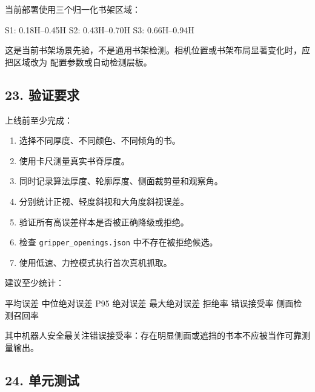 \documentclass[
  chinese,
  11pt,
  a4paper,
]{article}
\newenvironment{Shaded}{\begin{snugshade}}{\end{snugshade}}
\newcommand{\NormalTok}[1]{#1}
\providecommand{\tightlist}{%
  \setlength{\itemsep}{0pt}\setlength{\parskip}{0pt}}
\begin{document}
当前部署使用三个归一化书架区域：

\begin{Shaded}
\begin{Highlighting}[]
\NormalTok{S1: 0.18H–0.45H}
\NormalTok{S2: 0.43H–0.70H}
\NormalTok{S3: 0.66H–0.94H}
\end{Highlighting}
\end{Shaded}

这是当前书架场景先验，不是通用书架检测。相机位置或书架布局显著变化时，应把区域改为
配置参数或自动检测层板。

\subsection{23. 验证要求}\label{23-ux9a8cux8bc1ux8981ux6c42}

上线前至少完成：

\begin{enumerate}
\def\labelenumi{\arabic{enumi}.}
\tightlist
\item
  选择不同厚度、不同颜色、不同倾角的书。
\item
  使用卡尺测量真实书脊厚度。
\item
  同时记录算法厚度、轮廓厚度、侧面裁剪量和观察角。
\item
  分别统计正视、轻度斜视和大角度斜视误差。
\item
  验证所有高误差样本是否被正确降级或拒绝。
\item
  检查 \texttt{gripper\_openings.json} 中不存在被拒绝候选。
\item
  使用低速、力控模式执行首次真机抓取。
\end{enumerate}

建议至少统计：

\begin{Shaded}
\begin{Highlighting}[]
\NormalTok{平均误差}
\NormalTok{中位绝对误差}
\NormalTok{P95 绝对误差}
\NormalTok{最大绝对误差}
\NormalTok{拒绝率}
\NormalTok{错误接受率}
\NormalTok{侧面检测召回率}
\end{Highlighting}
\end{Shaded}

其中机器人安全最关注错误接受率：存在明显侧面或遮挡的书本不应被当作可靠测量输出。

\subsection{24. 单元测试}\label{24-ux5355ux5143ux6d4bux8bd5}
\end{document}
